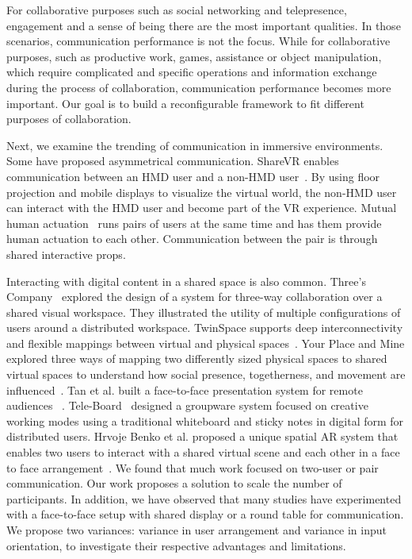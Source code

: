 \documentclass{sigchi}
\begin{document}
For collaborative purposes such as social networking and telepresence, engagement and a sense of being there are the most important qualities. In those scenarios, communication performance is not the focus. While for collaborative purposes, such as productive work, games, assistance or object manipulation, which require complicated and specific operations and information exchange during the process of collaboration, communication performance becomes more important. Our goal is to build a reconfigurable framework to fit different purposes of collaboration.

Next, we examine the trending of communication in immersive environments. Some have proposed asymmetrical communication. ShareVR enables communication between an HMD user and a non-HMD user~\cite{gugenheimer2017sharevr}. By using floor projection and mobile displays to visualize the virtual world, the non-HMD user can interact with the HMD user and become part of the VR experience. Mutual human actuation~\cite{cheng2017mutual} runs pairs of users at the same time and has them provide human actuation to each other. Communication between the pair is through shared interactive props.

Interacting with digital content in a shared space is also common. Three's Company~\cite{tang2010three} explored the design of a system for three-way collaboration over a shared visual workspace. They illustrated the utility of multiple configurations of users around a distributed workspace. TwinSpace supports deep interconnectivity and flexible mappings between virtual and physical spaces~\cite{reilly2010twinspace}. Your Place and Mine explored three ways of mapping two differently sized physical spaces to shared virtual spaces to understand how social presence, togetherness, and movement are influenced~\cite{sra2018}. Tan et al. built a face-to-face presentation system for remote audiences ~\cite{gazeAwareness}. Tele-Board~\cite{gumienny2011tele} designed a groupware system focused on creative working modes using a traditional whiteboard and sticky notes in digital form for distributed users. Hrvoje Benko et al. proposed a unique spatial AR system that enables two users to interact with a shared virtual scene and each other in a face to face arrangement~\cite{benko2014dyadic}. We found that much work focused on two-user or pair communication. Our work proposes a solution to scale the number of participants. In addition, we have observed that many studies have experimented with a face-to-face setup with shared display or a round table for communication. We propose two variances: variance in user arrangement and variance in input orientation, to investigate their respective advantages and limitations.
\end{document}

